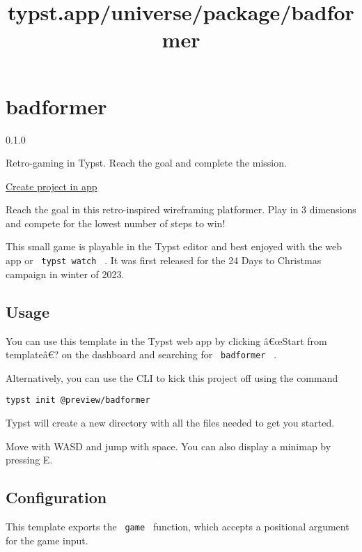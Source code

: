 \title{typst.app/universe/package/badformer}

\label{banner}
\label{template-thumbnail}

\section{badformer}\label{badformer}

{ 0.1.0 }

Retro-gaming in Typst. Reach the goal and complete the mission.

\href{/app?template=badformer&version=0.1.0}{Create project in app}

\label{readme}
Reach the goal in this retro-inspired wireframing platformer. Play in 3
dimensions and compete for the lowest number of steps to win!

This small game is playable in the Typst editor and best enjoyed with
the web app or \texttt{\ typst\ watch\ } . It was first released for the
24 Days to Christmas campaign in winter of 2023.

\subsection{Usage}\label{usage}

You can use this template in the Typst web app by clicking â€œStart from
templateâ€? on the dashboard and searching for \texttt{\ badformer\ } .

Alternatively, you can use the CLI to kick this project off using the
command

\begin{verbatim}
typst init @preview/badformer
\end{verbatim}

Typst will create a new directory with all the files needed to get you
started.

Move with WASD and jump with space. You can also display a minimap by
pressing E.

\subsection{Configuration}\label{configuration}

This template exports the \texttt{\ game\ } function, which accepts a
positional argument for the game input.

